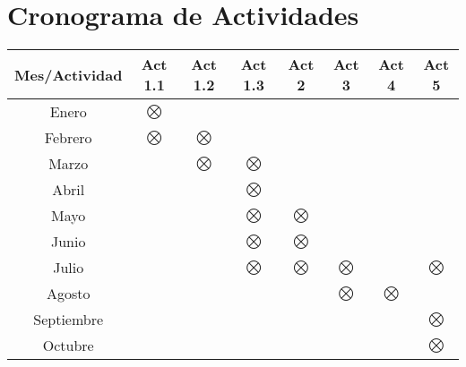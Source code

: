 \section{Cronograma de Actividades}	


\begin{center}
{\small
\begin{tabular}{|c|c|c|c|c|c|c|c|}
\hline

\textbf{Mes}/\textbf{Actividad}&\textbf{Act 1.1}&\textbf{Act 1.2}
&\textbf{Act 1.3}&\textbf{Act 2}&\textbf{Act 3}&\textbf{Act 4}&\textbf{Act 5}\\

\hline

Enero&$\bigotimes$&&&&&&\\

\hline

Febrero&$\bigotimes$&$\bigotimes$&&&&&\\

\hline

Marzo&&$\bigotimes$&$\bigotimes$&&&&\\

\hline

Abril&&&$\bigotimes$&&&&\\

\hline

Mayo&&&$\bigotimes$&$\bigotimes$&&&\\

\hline

Junio&&&$\bigotimes$&$\bigotimes$&&&\\

\hline
Julio&&&$\bigotimes$&$\bigotimes$&$\bigotimes$&&$\bigotimes$\\

\hline

Agosto&&&&&$\bigotimes$&$\bigotimes$&\\

\hline 

Septiembre&&&&&&&$\bigotimes$\\

\hline
Octubre&&&&&&&$\bigotimes$\\
\hline

\end{tabular}
}
\end{center}